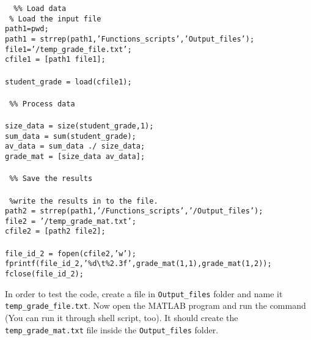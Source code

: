  \begin{mdframed}[hidealllines=true,backgroundcolor=gray!20]
 \begin{singlespace}
 \fontsize{10pt}{1pt}
 \texttt{
{ \color{matlab_green}\%\% Load data}\\
{ \color{matlab_green}\% Load the input file}\\
path1=pwd;\\
path1 = strrep(path1,{\color{matlab_pink}'Functions\_scripts'},{\color{matlab_pink}'Output\_files'}); \\
file1={\color{matlab_pink}'/temp\_grade\_file.txt'};\\
cfile1 = [path1 file1];\\
\\
student\_grade = load(cfile1);\\
\\
{ \color{matlab_green}\%\% Process data}\\
\\
size\_data = size(student\_grade,1);\\
sum\_data = sum(student\_grade);\\
av\_data = sum\_data ./ size\_data;\\
grade\_mat = [size\_data av\_data];\\
\\
{ \color{matlab_green}\%\% Save the results}\\
\\
{ \color{matlab_green}\%write the results in to the file.} \\
path2 = strrep(path1,{\color{matlab_pink}'/Functions\_scripts'},{\color{matlab_pink}'/Output\_files'});\\ 
file2 = {\color{matlab_pink}'/temp\_grade\_mat.txt'};\\
cfile2 = [path2 file2];\\
\\
file\_id\_2 = fopen(cfile2,{\color{matlab_pink}'w'});\\
fprintf(file\_id\_2,{\color{matlab_pink}'\%d\textbackslash t\%2.3f'},grade\_mat(1,1),grade\_mat(1,2));\\
fclose(file\_id\_2);
}
\end{singlespace}
\end{mdframed}
\noindent
In order to test the code, create a file in \texttt{Output\_files} folder and name it \texttt{temp\_grade\_file.txt}. Now open the MATLAB program and run the command (You can run it through shell script, too). It should create the \texttt{temp\_grade\_mat.txt} file inside the  \texttt{Output\_files} folder. \\
